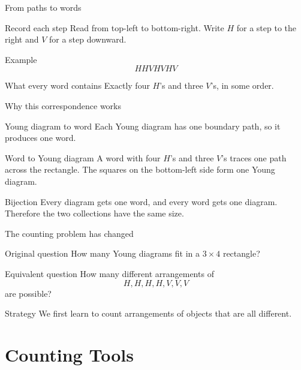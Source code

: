\documentclass{beamer}
\begin{document}
\begin{frame}{From paths to words}
  \begin{block}{Record each step}
    Read from top-left to bottom-right.  Write $H$ for a step to the right
    and $V$ for a step downward.
  \end{block}
\pause
  \begin{block}{Example}
    \[
       HHVHVHV
    \]
  \end{block}
\pause
  \begin{block}{What every word contains}
    Exactly four $H$'s and three $V$'s, in some order.
  \end{block}
\end{frame}

\begin{frame}{Why this correspondence works}
\small
  \begin{block}{Young diagram to word}
    Each Young diagram has one boundary path, so it produces one word.
  \end{block}
\pause
  \begin{block}{Word to Young diagram}
    A word with four $H$'s and three $V$'s traces one path across the
    rectangle.  The squares on the bottom-left side form one Young diagram.
  \end{block}
\pause
  \begin{block}{Bijection}
    Every diagram gets one word, and every word gets one diagram.
    Therefore the two collections have the same size.
  \end{block}
\end{frame}

\begin{frame}{The counting problem has changed}
\small
  \begin{block}{Original question}
    How many Young diagrams fit in a $3\times4$ rectangle?
  \end{block}
\pause
  \begin{block}{Equivalent question}
    How many different arrangements of
    \[
       H,H,H,H,V,V,V
    \]
    are possible?
  \end{block}
\pause
  \begin{block}{Strategy}
    We first learn to count arrangements of objects that are all different.
  \end{block}
\end{frame}

\section{Counting Tools}
\end{document}
